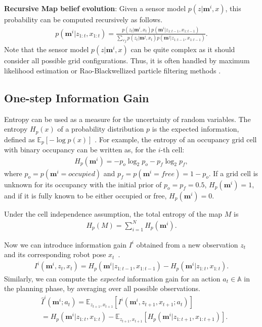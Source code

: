 \documentclass{article}
\newcommand{\ph}[1]{{\textbf{#1}:}} %
\begin{document}
\ph{Recursive Map belief evolution} Given a sensor model $p(z | \mathbf{m}^i, x)$, this probability can be computed recursively as follows.
\begin{align}
  p(\mathbf{m}^i | z_{1:t}, x_{1:t}) =
  \frac{p(z_t | \mathbf{m}^i, x_{t}) p(\mathbf{m}^i | z_{1:t-1}, x_{1:t-1})}
       {\sum_{\forall j} p(z_t | \mathbf{m}^j, x_{t}) p(\mathbf{m}^j | z_{1:t-1}, x_{1:t-1})}.
\end{align}
Note that the sensor model $p(z | \mathbf{m}^i, x)$ can be quite complex as it should consider all possible grid configurations.
Thus, it is often handled by maximum likelihood estimation or Rao-Blackwellized particle filtering methods \cite{burgard2005coordinated,stachniss2005information}.

\subsection{One-step Information Gain}
Entropy can be used as a measure for the uncertainty of random variables.
The entropy $H_p(x)$ of a probability distribution $p$ is the expected information, defined as $\mathbb{E}_p[-\log p(x)]$ \cite{cover2012elements}.
For example, the entropy of an occupancy grid cell with binary occupancy can be written as, for the $i$-th cell:
\begin{align}
  H_p(\mathbf{m}^i) = -p_o \log_2 p_{o} - p_f \log_2 p_f,
\end{align}
where $p_o = p(\mathbf{m}^i = occupied)$ and $p_f = p(\mathbf{m}^i = free) = 1 - p_o$.
If a grid cell is unknown for its occupancy with the initial prior of $p_o = p_f = 0.5$, $H_p(\mathbf{m}^i) = 1$, and if it is fully known to be either occupied or free, $H_{p}(\mathbf{m}^i) = 0$.
%

Under the cell independence assumption, the total entropy of the map $M$ is
\begin{align}
  H_p(M) = \textstyle \sum_{i = 1}^N H_{p}(\mathbf{m}^i).
\end{align}

Now we can introduce information gain $I^i$ obtained from a new observation $z_t$ and its corresponding robot pose $x_t$~\cite{cover2012elements}.
\begin{align}
  I^i(\mathbf{m}^i, z_t, x_t) = H_p(\mathbf{m}^i | z_{1:t-1}, x_{1:t-1}) - H_p(\mathbf{m}^i | z_{1:t}, x_{1:t}).
\end{align}
Similarly, we can compute the \textit{expected} information gain for an action $a_t \in \mathbb{A}$ in the planning phase, by averaging over all possible observations.
\begin{align}
  &\hat{I}^i(\mathbf{m}^i; a_t)
  = \mathbb{E}_{z_{t+1}, x_{t+1}} [ I^i (\mathbf{m}^i, z_{t+1}, x_{t+1}; a_t) ] \nonumber \\
  &\!\!= H_p(\mathbf{m}^i | z_{1:t}, x_{1:t}) - \mathbb{E}_{z_{t+1}, x_{t+1}} [ H_p (\mathbf{m}^i | z_{1:t+1}, x_{1:t+1}) ].
\end{align}
\end{document}
